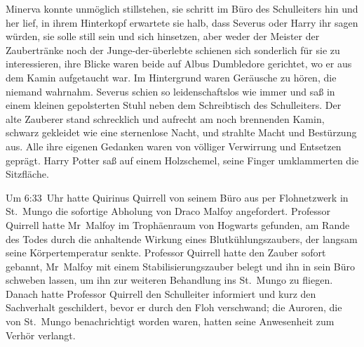 Minerva konnte unmöglich stillstehen, sie schritt im Büro des Schulleiters hin und her lief, in ihrem Hinterkopf erwartete sie halb, dass Severus oder Harry ihr sagen würden, sie solle still sein und sich hinsetzen, aber weder der Meister der Zaubertränke noch der Junge-der-überlebte schienen sich sonderlich für sie zu interessieren, ihre Blicke waren beide auf Albus Dumbledore gerichtet, wo er aus dem Kamin aufgetaucht war. Im Hintergrund waren Geräusche zu hören, die niemand wahrnahm. Severus schien so leidenschaftslos wie immer und saß in einem kleinen gepolsterten Stuhl neben dem Schreibtisch des Schulleiters. Der alte Zauberer stand schrecklich und aufrecht am noch brennenden Kamin, schwarz gekleidet wie eine sternenlose Nacht, und strahlte Macht und Bestürzung aus. Alle ihre eigenen Gedanken waren von völliger Verwirrung und Entsetzen geprägt. Harry Potter saß auf einem Holzschemel, seine Finger umklammerten die Sitzfläche.

Um 6:33~Uhr hatte Quirinus Quirrell von seinem Büro aus per Flohnetzwerk in St.~Mungo die sofortige Abholung von Draco Malfoy angefordert. Professor Quirrell hatte Mr~Malfoy im Trophäenraum von Hogwarts gefunden, am Rande des Todes durch die anhaltende Wirkung eines Blutkühlungszaubers, der langsam seine Körpertemperatur senkte. Professor Quirrell hatte den Zauber sofort gebannt, Mr~Malfoy mit einem Stabilisierungszauber belegt und ihn in sein Büro schweben lassen, um ihn zur weiteren Behandlung ins St.~Mungo zu fliegen. Danach hatte Professor Quirrell den Schulleiter informiert und kurz den Sachverhalt geschildert, bevor er durch den Floh verschwand; die Auroren, die von St.~Mungo benachrichtigt worden waren, hatten seine Anwesenheit zum Verhör verlangt.

